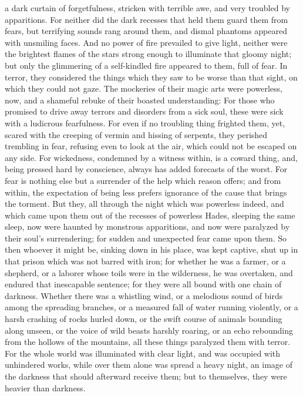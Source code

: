 a dark curtain of forgetfulness, stricken with terrible awe, and very
troubled by apparitions.  For neither did the dark recesses
that held them guard them from fears, but terrifying sounds rang around
them, and dismal phantoms appeared with unsmiling faces. 
And no power of fire prevailed to give light, neither were the brightest
flames of the stars strong enough to illuminate that gloomy night;
 but only the glimmering of a self-kindled fire appeared to
them, full of fear. In terror, they considered the things which they saw
to be worse than that sight, on which they could not gaze. 
The mockeries of their magic arts were powerless, now, and a shameful
rebuke of their boasted understanding:  For those who
promised to drive away terrors and disorders from a sick soul, these
were sick with a ludicrous fearfulness.  For even if no
troubling thing frighted them, yet, scared with the creeping of vermin
and hissing of serpents,  they perished trembling in fear,
refusing even to look at the air, which could not be escaped on any
side.  For wickedness, condemned by a witness within, is a
coward thing, and, being pressed hard by conscience, always has added
forecasts of the worst.  For fear is nothing else but a
surrender of the help which reason offers;  and from
within, the expectation of being less prefers ignorance of the cause
that brings the torment.  But they, all through the night
which was powerless indeed, and which came upon them out of the recesses
of powerless Hades, sleeping the same sleep,  now were
haunted by monstrous apparitions, and now were paralyzed by their soul's
surrendering; for sudden and unexpected fear came upon them.
 So then whoever it might be, sinking down in his place,
was kept captive, shut up in that prison which was not barred with iron;
 for whether he was a farmer, or a shepherd, or a laborer
whose toils were in the wilderness, he was overtaken, and endured that
inescapable sentence; for they were all bound with one chain of
darkness.  Whether there was a whistling wind, or a
melodious sound of birds among the spreading branches, or a measured
fall of water running violently,  or a harsh crashing of
rocks hurled down, or the swift course of animals bounding along unseen,
or the voice of wild beasts harshly roaring, or an echo rebounding from
the hollows of the mountains, all these things paralyzed them with
terror.  For the whole world was illuminated with clear
light, and was occupied with unhindered works,  while over
them alone was spread a heavy night, an image of the darkness that
should afterward receive them; but to themselves, they were heavier than
darkness.

